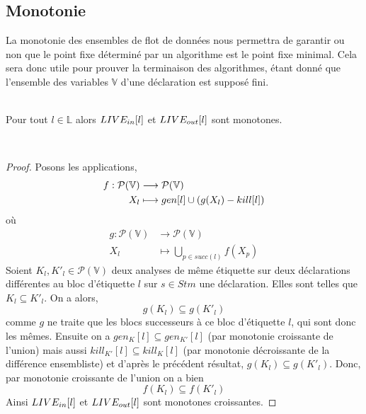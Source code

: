 \documentclass[a4paper, 11pt]{article}
\begin{document}
\subsection{Monotonie}
La monotonie des ensembles de flot de données nous permettra de garantir ou non que le point fixe déterminé par un
algorithme est le point fixe minimal. 
Cela sera donc utile pour prouver la terminaison des algorithmes, étant donné que l'ensemble des variables $\mathbb{V}$ d'une déclaration est supposé fini.
\\
\\
\begin{lemma}
	Pour tout $l \in \mathbb{L}$ alors $LIVE_{in}[l]$ et $LIVE_{out}[l]$ sont monotones.
\end{lemma}
\\
\begin{proof}	
Posons les applications,
\begin{align*}
	f : \mathcal{P}(\mathbb{V}) &\longrightarrow \mathcal{P}(\mathbb{V}) \\
	X_l &\longmapsto gen[l] \cup (g(X_l) - kill[l])
\end{align*}
où
\begin{align*}
	g : \mathcal{P}(\mathbb{V}) &\longrightarrow \mathcal{P}(\mathbb{V})\\
	X_l &\longmapsto \bigcup\limits_{p\in succ(l)} f(X_p)
\end{align*}
Soient $K_l, K'_l \in \mathcal{P}(\mathbb{V})$ deux analyses de même étiquette sur deux déclarations différentes au bloc
d'étiquette $l$ sur $s \in Stm$ une déclaration. Elles sont telles que $K_l \subseteq K'_l$. On a alors,
\[
	g(K_l) \subseteq g(K'_l)
\]
comme $g$ ne traite que les blocs successeurs à ce bloc d'étiquette $l$, qui sont donc les mêmes.
Ensuite on a $gen_K[l] \subseteq gen_{K'}[l]$ (par monotonie croissante de l'union) mais aussi $kill_{K'}[l] \subseteq kill_K[l]$ (par monotonie décroissante
de la différence ensembliste) et d'après le précédent
résultat, $g(K_l) \subseteq g(K'_l)$. Donc, par monotonie croissante de l'union on a bien
\[
	f(K_l) \subseteq f(K'_l)	
\]
Ainsi $LIVE_{in}[l]$ et $LIVE_{out}[l]$ sont monotones croissantes.
\end{proof}
\end{document}
